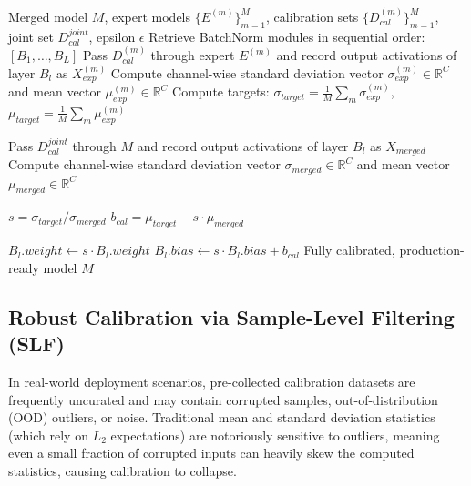 \documentclass{article}
\begin{document}
\begin{algorithm}[tb]
\caption{Reparameterized Sequential Calibration (RepSeqCalib)}
\label{alg:repseqcalib}
\begin{small}
\begin{algorithmic}[1]
 Merged model $M$, expert models $\{E^{(m)}\}_{m=1}^M$, calibration sets $\{D_{cal}^{(m)}\}_{m=1}^M$, joint set $D_{cal}^{joint}$, epsilon $\epsilon$
\STATE Retrieve BatchNorm modules in sequential order: $[B_1, \dots, B_L]$
        \STATE Pass $D_{cal}^{(m)}$ through expert $E^{(m)}$ and record output activations of layer $B_l$ as $X_{exp}^{(m)}$
        \STATE Compute channel-wise standard deviation vector $\sigma_{exp}^{(m)} \in \mathbb{R}^C$ and mean vector $\mu_{exp}^{(m)} \in \mathbb{R}^C$
    \ENDFOR
    \STATE Compute targets: $\sigma_{target} = \frac{1}{M}\sum_m \sigma_{exp}^{(m)}$, $\mu_{target} = \frac{1}{M}\sum_m \mu_{exp}^{(m)}$
    
    \STATE Pass $D_{cal}^{joint}$ through $M$ and record output activations of layer $B_l$ as $X_{merged}$
    \STATE Compute channel-wise standard deviation vector $\sigma_{merged} \in \mathbb{R}^C$ and mean vector $\mu_{merged} \in \mathbb{R}^C$
    
    \STATE $s = \sigma_{target} / \sigma_{merged}$
    \STATE $b_{cal} = \mu_{target} - s \cdot \mu_{merged}$
    
    \STATE $B_l.weight \leftarrow s \cdot B_l.weight$
    \STATE $B_l.bias \leftarrow s \cdot B_l.bias + b_{cal}$
\ENDFOR
{} Fully calibrated, production-ready model $M$
\end{algorithmic}
\end{small}
\end{algorithm}

\subsection{Robust Calibration via Sample-Level Filtering (SLF)}
In real-world deployment scenarios, pre-collected calibration datasets are frequently uncurated and may contain corrupted samples, out-of-distribution (OOD) outliers, or noise. Traditional mean and standard deviation statistics (which rely on $L_2$ expectations) are notoriously sensitive to outliers, meaning even a small fraction of corrupted inputs can heavily skew the computed statistics, causing calibration to collapse.
\end{document}

